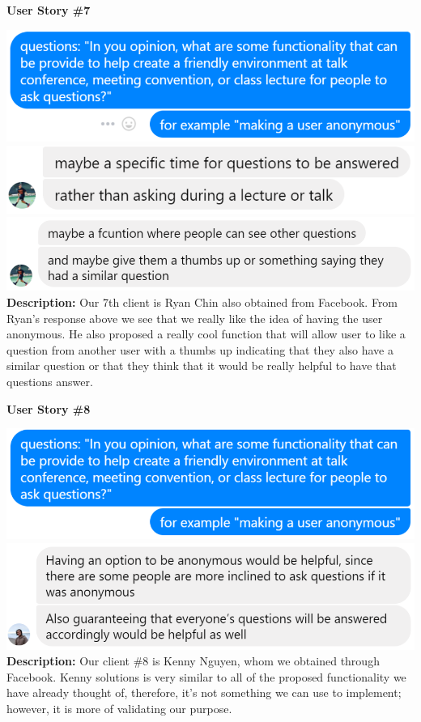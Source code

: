 \documentclass[12pt]{article}
\begin{document}
\textbf{User Story \#7}
\begin{flushleft}
\includegraphics[width=\textwidth]{Assignment5_userstory_7a.eps}
\includegraphics[width=\textwidth]{Assignment5_userstory_7b.eps}
\includegraphics[width=\textwidth]{Assignment5_userstory_7c.eps}
\textbf{Description:} Our 7th client is Ryan Chin also obtained from Facebook. From Ryan's response above we see that we really like the idea of having the user anonymous. He also proposed a really cool function that will allow user to like a question from another user with a thumbs up indicating that they also have a similar question or that they think that it would be really helpful to have that questions answer.\newline
\end{flushleft}

\textbf{User Story \#8}
\begin{flushleft}
\includegraphics[width=\textwidth]{Assignment5_userstory_8a.eps}
\includegraphics[width=\textwidth]{Assignment5_userstory_8b.eps}
\textbf{Description:} Our client \#8 is Kenny Nguyen, whom we obtained through Facebook. Kenny solutions is very similar to all of the proposed functionality we have already thought of, therefore, it's not something we can use to implement; however, it is more of validating our purpose.\newline
\end{flushleft}
\end{document}
